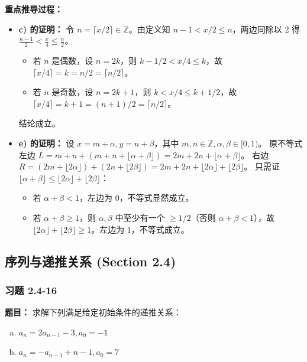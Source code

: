 \documentclass[11pt,UTF8]{article}
\begin{document}
\textbf{重点推导过程：}
\begin{itemize}
    \item \textbf{c) 的证明：}
    令 $n = \lceil x/2 \rceil \in \mathbb{Z}$。由定义知 $n-1 < x/2 \le n$，两边同除以 2 得 $\frac{n-1}{2} < \frac{x}{4} \le \frac{n}{2}$。
    \begin{itemize}
        \item 若 $n$ 是偶数，设 $n=2k$，则 $k-1/2 < x/4 \le k$，故 $\lceil x/4 \rceil = k = n/2 = \lceil n/2 \rceil$。
        \item 若 $n$ 是奇数，设 $n=2k+1$，则 $k < x/4 \le k+1/2$，故 $\lceil x/4 \rceil = k+1 = (n+1)/2 = \lceil n/2 \rceil$。
    \end{itemize}
    结论成立。

    \item \textbf{e) 的证明：}
    设 $x = m + \alpha, y = n + \beta$，其中 $m, n \in \mathbb{Z}, \alpha, \beta \in [0, 1)$。
    原不等式左边 $L = m + n + (m + n + \lfloor \alpha + \beta \rfloor) = 2m + 2n + \lfloor \alpha + \beta \rfloor$。
    右边 $R = (2m + \lfloor 2\alpha \rfloor) + (2n + \lfloor 2\beta \rfloor) = 2m + 2n + \lfloor 2\alpha \rfloor + \lfloor 2\beta \rfloor$。
    只需证 $\lfloor \alpha + \beta \rfloor \le \lfloor 2\alpha \rfloor + \lfloor 2\beta \rfloor$：
    \begin{itemize}
        \item 若 $\alpha + \beta < 1$，左边为 $0$，不等式显然成立。
        \item 若 $\alpha + \beta \ge 1$，则 $\alpha, \beta$ 中至少有一个 $\ge 1/2$（否则 $\alpha+\beta < 1$），故 $\lfloor 2\alpha \rfloor + \lfloor 2\beta \rfloor \ge 1$。左边为 $1$，不等式成立。
    \end{itemize}
\end{itemize}

\subsection{序列与递推关系 (Section 2.4)}

\subsubsection*{习题 2.4-16}
\textbf{题目：} 求解下列满足给定初始条件的递推关系：
\begin{enumerate}[a)]
    \item $a_n = 2a_{n-1} - 3, a_0 = -1$
    \item $a_n = -a_{n-1} + n - 1, a_0 = 7$
\end{enumerate}
\end{document}

